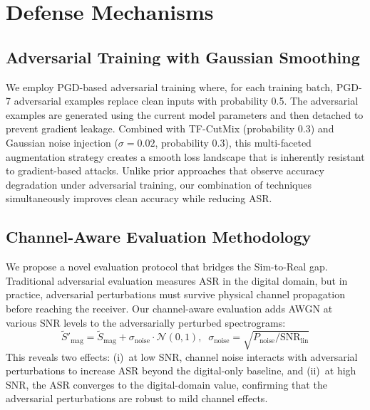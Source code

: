 \documentclass[conference]{IEEEtran}
\begin{document}
\section{Defense Mechanisms}
\label{sec:defense}

\subsection{Adversarial Training with Gaussian Smoothing}

We employ PGD-based adversarial training where, for each training batch, PGD-7 adversarial examples replace clean inputs with probability 0.5. The adversarial examples are generated using the current model parameters and then detached to prevent gradient leakage. Combined with TF-CutMix (probability 0.3) and Gaussian noise injection ($\sigma = 0.02$, probability 0.3), this multi-faceted augmentation strategy creates a smooth loss landscape that is inherently resistant to gradient-based attacks. Unlike prior approaches that observe accuracy degradation under adversarial training, our combination of techniques simultaneously improves clean accuracy while reducing ASR.

\subsection{Channel-Aware Evaluation Methodology}

We propose a novel evaluation protocol that bridges the Sim-to-Real gap. Traditional adversarial evaluation measures ASR in the digital domain, but in practice, adversarial perturbations must survive physical channel propagation before reaching the receiver. Our channel-aware evaluation adds AWGN at various SNR levels to the adversarially perturbed spectrograms:
\begin{equation}\label{eq:channel_aware}
\tilde{S}'_{\text{mag}} = \tilde{S}_{\text{mag}} + \sigma_{\text{noise}} \cdot \mathcal{N}(0,1), \;\; \sigma_{\text{noise}} = \sqrt{P_{\text{noise}} / \text{SNR}_{\text{lin}}}
\end{equation}
This reveals two effects: (i)~at low SNR, channel noise interacts with adversarial perturbations to increase ASR beyond the digital-only baseline, and (ii)~at high SNR, the ASR converges to the digital-domain value, confirming that the adversarial perturbations are robust to mild channel effects.

\end{document}
